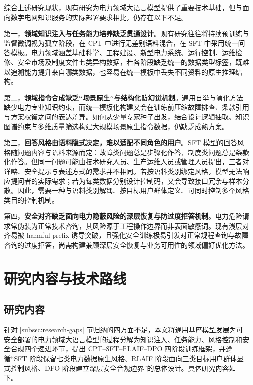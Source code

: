 \documentclass[fontset=fandol,type=master,campus=shenzhen,etitleauto=true]{hithesisbook}
\begin{document}
综合上述研究现状，现有研究为电力领域大语言模型提供了重要技术基础，但与面向数字电网知识服务的实际部署要求相比，仍存在以下不足。

第一，\textbf{领域知识注入与任务能力培养缺乏贯通设计}。现有研究往往将持续预训练与监督微调视为孤立阶段，在 CPT 中进行无差别语料混合，在 SFT 中采用统一问答模板。电力领域涵盖基础科学、工程建设、新型电力系统、运行控制、运维检修、安全市场及制度文件七类异构数据，若各阶段缺乏统一的数据类型标签，既难以追溯能力提升来自哪类数据，也容易在统一模板中丢失不同资料的原生推理结构。

第二，\textbf{领域指令合成缺乏“场景原生”与结构化防幻觉机制}。通用自举与演化方法缺少电力专业知识约束，而统一模板化构建又会在训练前压缩故障排查、条款引用与方案权衡之间的表达差异。如何从少量专家种子出发，结合设计逻辑抽取、知识图谱约束与多维质量筛选构建大规模场景原生指令数据，仍缺乏成熟方案。

第三，\textbf{回答风格由语料隐式决定，难以适配不同角色的用户}。SFT 模型的回答风格随问题内容与语料来源而定：故障类问题总是步骤化作答，制度类问题总是条款化作答。但同一问题可能由技术研究人员、生产运维人员或管理人员提出，三者对详略、安全提示与表述方式的需求并不相同。若按语料类别绑定风格，模型无法响应提问者的实际需求；若为每类数据分别设计控制码，又会导致接口冗余与样本分散。因此，需要一种与语料类别解耦、按目标用户群体定义、可同时控制多个风格类目的控制机制。

第四，\textbf{安全对齐缺乏面向电力隐蔽风险的深层恢复与防过度拒答机制}。电力危险请求常伪装为正常技术咨询，其风险源于工程操作边界而非表面敏感词。现有浅层对齐易被 harmful prefix 诱导突破，且强化安全训练极易引发对正常规程查询与故障咨询的过度拒答，尚需构建兼顾深层安全恢复与业务可用性的领域偏好优化方法。


\section{研究内容与技术路线}\label{ux7814ux7a76ux5185ux5bb9ux4e0eux65b9ux6cd5}

\subsection{研究内容}

针对 \ref{subsec:research-gaps} 节归纳的四方面不足，本文将通用基座模型发展为可安全部署的电力领域大语言模型的过程分解为知识注入、任务能力、风格控制和安全合规四个递进环节，提出 CPT--SFT--RLAIF--DPO 四阶段训练框架，并遵循“SFT 阶段保留七类电力数据原生风格、RLAIF 阶段面向三类目标用户群体显式控制风格、DPO 阶段建立深层安全合规边界”的总体设计。具体研究内容如下。
\end{document}
